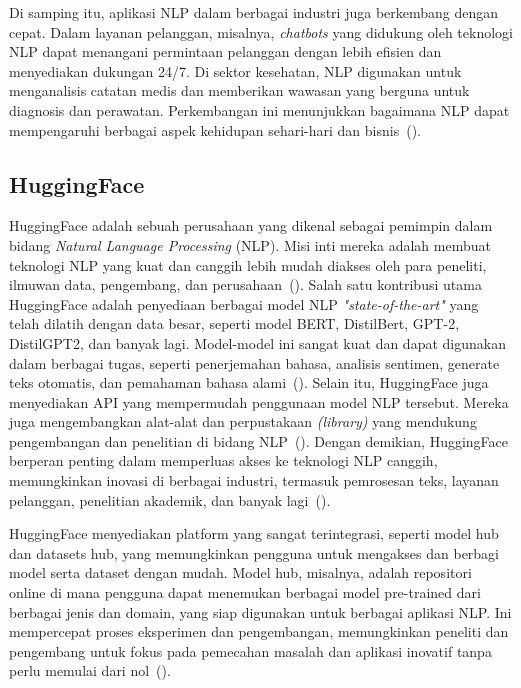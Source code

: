 Di samping itu, aplikasi NLP dalam berbagai industri juga berkembang dengan cepat. Dalam layanan pelanggan, misalnya, \emph{chatbots} yang didukung oleh teknologi NLP dapat menangani permintaan pelanggan dengan lebih efisien dan menyediakan dukungan 24/7. Di sektor kesehatan, NLP digunakan untuk menganalisis catatan medis dan memberikan wawasan yang berguna untuk diagnosis dan perawatan. Perkembangan ini menunjukkan bagaimana NLP dapat mempengaruhi berbagai aspek kehidupan sehari-hari dan bisnis~(\cite{peters2018}).

\subsection{HuggingFace}

HuggingFace adalah sebuah perusahaan yang dikenal sebagai pemimpin
dalam bidang \emph{Natural Language Processing} (NLP). Misi inti mereka adalah 
membuat teknologi NLP yang kuat dan canggih lebih mudah diakses 
oleh para peneliti, ilmuwan data, pengembang, dan 
perusahaan~(\cite{huggingface}). Salah satu kontribusi 
utama HuggingFace adalah penyediaan berbagai model NLP 
\emph{"state-of-the-art"} yang telah dilatih dengan data 
besar, seperti model BERT, DistilBert, GPT-2, DistilGPT2, 
dan banyak lagi. Model-model ini sangat kuat dan dapat 
digunakan dalam berbagai tugas, seperti penerjemahan bahasa, 
analisis sentimen, generate teks otomatis, dan pemahaman 
bahasa alami~(\cite{wolf2020}). Selain itu, HuggingFace juga 
menyediakan API yang mempermudah penggunaan model NLP 
tersebut. Mereka juga mengembangkan alat-alat dan 
perpustakaan \emph{(library)} yang mendukung pengembangan 
dan penelitian di bidang NLP~(\cite{inference}). Dengan demikian, 
HuggingFace berperan penting dalam memperluas akses ke teknologi 
NLP canggih, memungkinkan inovasi di berbagai industri, termasuk 
pemrosesan teks, layanan pelanggan, penelitian akademik, dan 
banyak lagi~(\cite{azure}).

HuggingFace menyediakan platform yang sangat terintegrasi, seperti model hub dan datasets hub, yang memungkinkan pengguna untuk mengakses dan berbagi model serta dataset dengan mudah. Model hub, misalnya, adalah repositori online di mana pengguna dapat menemukan berbagai model pre-trained dari berbagai jenis dan domain, yang siap digunakan untuk berbagai aplikasi NLP. Ini mempercepat proses eksperimen dan pengembangan, memungkinkan peneliti dan pengembang untuk fokus pada pemecahan masalah dan aplikasi inovatif tanpa perlu memulai dari nol~(\cite{huggingface}).


